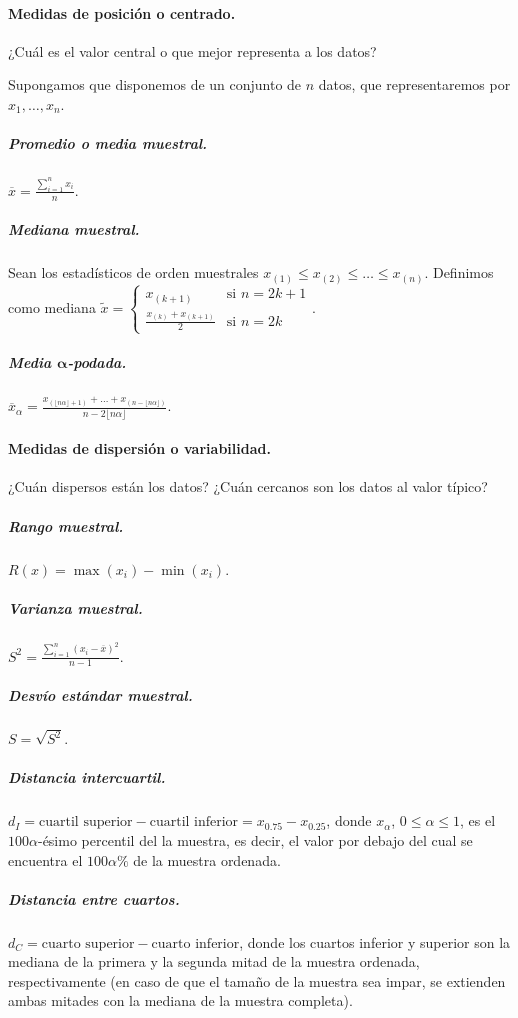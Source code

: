\documentclass[11pt]{article}
\theoremstyle{plain}
\theoremstyle{definition}
\theoremstyle{remark}
\begin{document}
      \paragraph{Medidas de posición o centrado.} ¿Cuál es el valor central o que mejor representa a los datos?

      Supongamos que disponemos de un conjunto de $n$ datos, que representaremos por $x_1, \dots, x_n$.

      \subparagraph{Promedio o media muestral.} $\displaystyle \overline{x} = \frac{\sum_{i=1}^n x_i}{n}$.

      \subparagraph{Mediana muestral.} Sean los estadísticos de orden muestrales $x_{(1)} \leq x_{(2)} \leq \dots \leq x_{(n)}$. Definimos como mediana $\tilde x = \begin{cases}
        \displaystyle x_{(k+1)} & \text{si $n = 2k + 1$} \\
        \displaystyle \frac{x_{(k)} + x_{(k + 1)}}{2} & \text{si $n = 2k$}
      \end{cases}$.

      \subparagraph{Media $\boldsymbol\alpha$-podada.} $\displaystyle \overline{x}_\alpha = \frac{x_{(\lfloor n \alpha \rfloor + 1)} + \dots + x_{(n - \lfloor n \alpha \rfloor)}}{n - 2 \lfloor n \alpha \rfloor}$.

      \paragraph{Medidas de dispersión o variabilidad.} ¿Cuán dispersos están los datos? ¿Cuán cercanos son los datos al valor típico?

      \subparagraph{Rango muestral.} $\displaystyle R(x) = \max(x_i) - \min(x_i)$.

      \subparagraph{Varianza muestral.} $\displaystyle S^2 = \frac{\sum_{i=1}^n (x_i - \overline{x})^2}{n - 1}$.

      \subparagraph{Desvío estándar muestral.} $S = \sqrt{S^2}$.

      \subparagraph{Distancia intercuartil.} $d_I = \text{cuartil superior} - \text{cuartil inferior} = x_{0.75} - x_{0.25}$, donde $x_\alpha$, $0 \leq \alpha \leq 1$, es el $100 \alpha$-ésimo percentil del la muestra, es decir, el valor por debajo del cual se encuentra el $100 \alpha \%$ de la muestra ordenada.

      \subparagraph{Distancia entre cuartos.} $d_C = \text{cuarto superior} - \text{cuarto inferior}$, donde los cuartos inferior y superior son la mediana de la primera y la segunda mitad de la muestra ordenada, respectivamente (en caso de que el tamaño de la muestra sea impar, se extienden ambas mitades con la mediana de la muestra completa).
\end{document}
